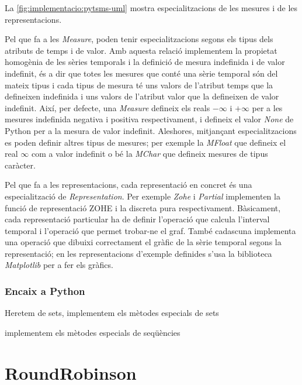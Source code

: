 La \autoref{fig:implementacio:pytsms-uml} mostra
especialitzacions de les mesures i de les representacions.

Pel que fa a les \emph{Measure}, poden tenir especialitzacions segons
els tipus dels atributs de temps i de valor. Amb aquesta relació
implementem la propietat homogènia de les sèries temporals i la
definició de mesura indefinida i de valor indefinit, és a dir que
totes les mesures que conté una sèrie temporal són del mateix tipus i
cada tipus de mesura té uns valors de l'atribut temps que la
defineixen indefinida i uns valors de l'atribut valor que la
defineixen de valor indefinit.  Així, per defecte, una \emph{Measure}
defineix els reals $-\infty$ i $+\infty$ per a les mesures indefinida
negativa i positiva respectivament, i defineix el valor \emph{None} de
Python per a la mesura de valor indefinit. Aleshores, mitjançant
especialitzacions es poden definir altres tipus de mesures; per
exemple la \emph{MFloat} que defineix el real $\infty$ com a valor
indefinit o bé la \emph{MChar} que defineix mesures de tipus caràcter.





Pel que fa a les representacions, cada representació en concret és una
especialització de \emph{Representation}. Per exemple \emph{Zohe} i
\emph{Partial} implementen la funció de representació ZOHE i la
discreta pura respectivament. 
Bàsicament, cada representació particular ha de definir l'operació que
calcula l'interval temporal i l'operació que permet trobar-ne el graf.
També cadascuna implementa una operació que dibuixi correctament el
gràfic de la sèrie temporal segons la representació; en les
representacions d'exemple definides s'usa la biblioteca
\emph{Matplotlib}  per a fer els gràfics.




\subsubsection{Encaix a Python}

\todo{}

Heretem de sets, implementem els mètodes especials de sets

implementem els mètodes especials de seqüències







\section{RoundRobinson}


